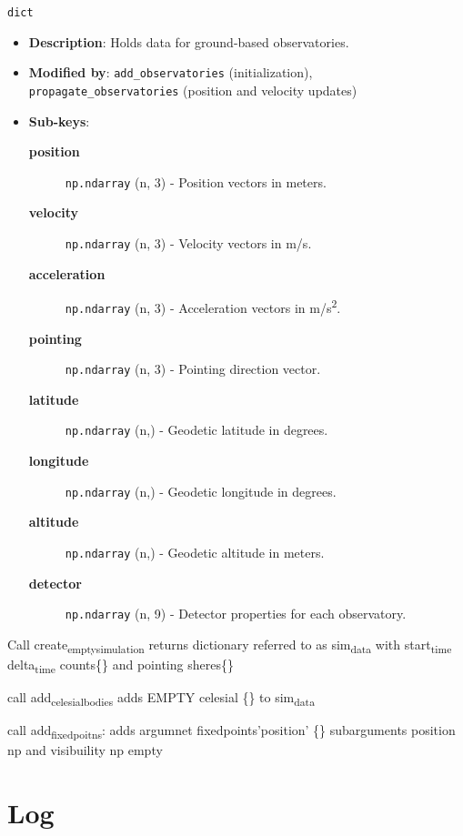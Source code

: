 \documentclass[11pt]{article}
\begin{document}
\begin{description}
\item[{\textbf{observatories}}] \texttt{dict}
\begin{itemize}
\item \textbf{Description}: Holds data for ground-based observatories.
\item \textbf{Modified by}: \texttt{add\_observatories} (initialization), \texttt{propagate\_observatories} (position and velocity updates)
\item \textbf{Sub-keys}:
\begin{description}
\item[{\textbf{position}}] \texttt{np.ndarray} (n, 3) - Position vectors in meters.
\item[{\textbf{velocity}}] \texttt{np.ndarray} (n, 3) - Velocity vectors in m/s.
\item[{\textbf{acceleration}}] \texttt{np.ndarray} (n, 3) - Acceleration vectors in m/s\textsuperscript{2}.
\item[{\textbf{pointing}}] \texttt{np.ndarray} (n, 3) - Pointing direction vector.
\item[{\textbf{latitude}}] \texttt{np.ndarray} (n,) - Geodetic latitude in degrees.
\item[{\textbf{longitude}}] \texttt{np.ndarray} (n,) - Geodetic longitude in degrees.
\item[{\textbf{altitude}}] \texttt{np.ndarray} (n,) - Geodetic altitude in meters.
\item[{\textbf{detector}}] \texttt{np.ndarray} (n, 9) - Detector properties for each observatory.
\end{description}
\end{itemize}

\item Call create\textsubscript{empty}\textsubscript{simulation}
returns dictionary referred to as sim\textsubscript{data}
with start\textsubscript{time} delta\textsubscript{time}  counts\{\} and pointing sheres\{\}
\item call add\textsubscript{celesial}\textsubscript{bodies}
adds EMPTY celesial \{\} to sim\textsubscript{data}
\item call add\textsubscript{fixed}\textsubscript{poitns}: adds argumnet fixedpoints'position' \{\}
subarguments position np and visibuility np empty
\item 
\end{description}




\section{Log}
\label{sec:org0b37bd6}
\end{document}
